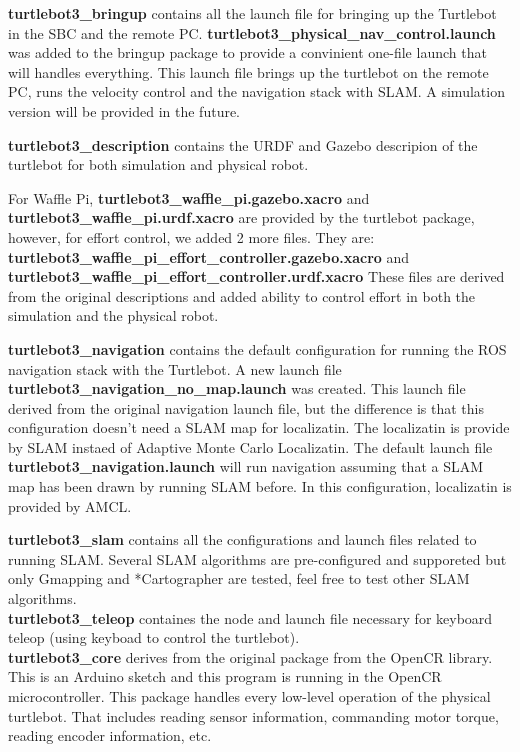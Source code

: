 \documentclass[12]{article}
\begin{document}
\textbf{turtlebot3\_bringup} contains all the launch file for bringing up the Turtlebot in the SBC and the remote PC. 
\textbf{turtlebot3\_physical\_nav\_control.launch} was added to the bringup package to provide a convinient one-file launch that will handles everything. 
This launch file brings up the turtlebot on the remote PC, runs the velocity control and the navigation stack with SLAM. A simulation version will be provided in the future.

\textbf{turtlebot3\_description} contains the URDF and Gazebo descripion of the turtlebot for both simulation and physical robot. 

For Waffle Pi, \textbf{turtlebot3\_waffle\_pi.gazebo.xacro}
and \textbf{turtlebot3\_waffle\_pi.urdf.xacro}
are provided by the turtlebot package, however, for effort control, we added 2 more files. 
They are: \\
\textbf{turtlebot3\_waffle\_pi\_effort\_controller.gazebo.xacro}
and \textbf{turtlebot3\_waffle\_pi\_effort\_controller.urdf.xacro}
These files are derived from the original descriptions and added ability to control effort in both the simulation and the physical robot. 

\textbf{turtlebot3\_navigation} contains the default configuration for running the ROS navigation stack with the Turtlebot.
A new launch file \textbf{turtlebot3\_navigation\_no\_map.launch} was created. This launch file derived from the original navigation launch file, but the difference is that this configuration doesn't need a SLAM map for localizatin. 
The localizatin is provide by SLAM instaed of Adaptive Monte Carlo Localizatin. The default launch file \textbf{turtlebot3\_navigation.launch} will run navigation assuming that a SLAM map has been drawn by running SLAM before. In this configuration, 
localizatin is provided by AMCL. 

\textbf{turtlebot3\_slam} contains all the configurations and launch files related to running SLAM. 
Several SLAM algorithms are pre-configured and supporeted but only Gmapping and *Cartographer are tested, feel free to test other SLAM algorithms. \\
\textbf{turtlebot3\_teleop} containes the node and launch file necessary for keyboard teleop (using keyboad to control the turtlebot). \\
\textbf{turtlebot3\_core} derives from the original package from the OpenCR library. This is an Arduino sketch and this program is running in the OpenCR microcontroller. This package handles every low-level operation of the physical turtlebot.
That includes reading sensor information, commanding motor torque, reading encoder information, etc. \\
\end{document}

